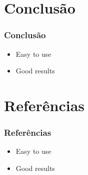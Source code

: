 \documentclass{beamer}
\begin{document}
\section{Conclus\~ao}

\begin{frame}
    \frametitle{Conclus\~ao}

    \begin{itemize}
        \item Easy to use
        \item Good results
    \end{itemize}
\end{frame}

\section{Refer\^encias}
\begin{frame}
    \frametitle{Refer\^encias}

    \begin{itemize}
        \item Easy to use
        \item Good results
    \end{itemize}
\end{frame}
\end{document}
